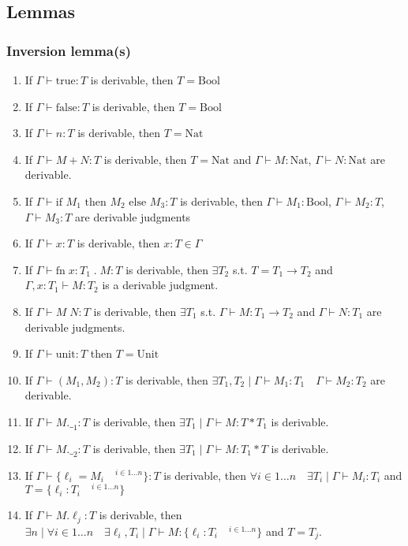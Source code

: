 \documentclass[11pt]{article}
\newcommand{\fn}[2]{\ensuremath{\text{fn}\; #1 \; . \; #2}}
\newcommand{\ifc}[3]{\ensuremath{\text{if } #1 \text{ then } #2 \text{ else } #3}}
\newcommand{\app}[2]{\ensuremath{ #1 \; #2}}
\newcommand{\true}{\ensuremath{\mbox{true}}}
\newcommand{\false}{\ensuremath{\mbox{false}}}
\newcommand{\Bool}{\ensuremath{\mbox{Bool}}}
\newcommand{\Nat}{\ensuremath{\mbox{Nat}}}
\newcommand{\unit}{\ensuremath{\mbox{unit}}}
\newcommand{\Unit}{\ensuremath{\mbox{Unit}}}
\newcommand{\type}[2]{\ensuremath{ #1 : #2 }}
\newcommand{\pair}[2]{\ensuremath{( #1 , #2 )}}
\newcommand{\fst}[1]{\ensuremath{ #1 . \__1}}
\newcommand{\snd}[1]{\ensuremath{ #1 . \__2}}
\newcommand{\rec}[1]{\ensuremath{ \{ #1 \} }}
\newcommand{\sel}[2]{\ensuremath{ #1 . #2 }}
\begin{document}
\subsection*{Lemmas}
\label{sec:org8ff9e13}

\subsubsection*{Inversion lemma(s)}
\label{sec:org55ea69b}
\begin{enumerate}
\item If \(\Gamma\vdash\type{\true}{T}\) is derivable, then \(T = \Bool\)
\item If \(\Gamma\vdash\type{\false}{T}\) is derivable, then \(T = \Bool\)
\item If \(\Gamma\vdash\type{n}{T}\) is derivable, then \(T = \Nat\)
\item If \(\Gamma\vdash\type{M+N}{T}\) is derivable, then \(T = \Nat\) and \(\Gamma \vdash \type{M}{\Nat}\),
\(\Gamma\vdash\type{N}{\Nat}\) are derivable.
\item If \(\Gamma\vdash\type{\ifc{M_1}{M_2}{M_3}}{T}\) is derivable,
then \(\Gamma\vdash\type{M_1}{\Bool}\),
\(\Gamma\vdash\type{M_2}{T}\), \(\Gamma\vdash\type{M_3}{T}\)
are derivable judgments
\item If \(\Gamma\vdash\type{x}{T}\) is derivable, then \(\type{x}{T}
       \in \Gamma\)
\item If \(\Gamma\vdash\type{\fn{\type{x}{T_1}}{M}}{T}\) is
derivable, then \(\exists T_2\) s.t. \(T = T_1 \to T_2\) and
\(\Gamma, \type{x}{T_1}\vdash \type{M}{T_2}\) is a derivable
judgment.
\item If \(\Gamma\vdash\type{\app{M}{N}}{T}\) is derivable, then
\(\exists T_1\) s.t. \(\Gamma\vdash\type{M}{T_1\to T_2}\) and
\(\Gamma\vdash\type{N}{T_1}\) are derivable judgments.
\item If \(\Gamma\vdash \type{\unit}{T}\) then \(T = \Unit\)
\item If \(\Gamma\vdash \type{\pair{M_1}{M_2}}{T}\) is derivable,
then \(\exists T_1, T_2 \mid \Gamma\vdash \type{M_1}{T_1}
        \quad \Gamma\vdash \type{M_2}{T_2}\) are derivable.
\item If \(\Gamma\vdash \type{\fst{M}}{T}\) is derivable, then
\(\exists T_1 \mid \Gamma\vdash \type{M}{T * T_1}\) is
derivable.
\item If \(\Gamma\vdash \type{\snd{M}}{T}\) is derivable, then
\(\exists T_1 \mid \Gamma\vdash \type{M}{T_1 * T}\) is
derivable.
\item If \(\Gamma\vdash \type{\rec{\ell_i = M_i \quad^{i\in 1\dots
        n}}} {T}\) is derivable, then \(\forall i \in 1 \dots n \quad
        \exists T_i \mid \Gamma\vdash \type{M_i}{T_i}\) and \(T =
        \rec{\type{\ell_i}{T_i}\quad^{i \in 1\dots n}}\)
\item If \(\Gamma\vdash \type{\sel{M}{\ell_j}}{T}\) is derivable,
then \(\exists n \mid \forall i \in 1\dots n\quad \exists
        \ell_i, T_i \mid \Gamma\vdash \type{M}{\rec{\type{\ell_i}{T_i}
        \quad^{i \in 1\dots n}}}\) and \(T = T_j\).
\end{enumerate}
\end{document}
